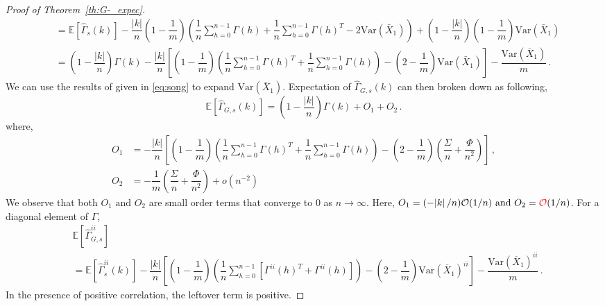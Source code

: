 \documentclass[11pt]{article}
\newcommand{\E}{\mathbb{E}}
\newcommand{\Var}{\text{Var}}
\theoremstyle{remark}
\begin{document}
\begin{proof}[Proof of Theorem~\ref{th:G-_expec}]
\begin{align*}
    &= \mathbb{E}\left[\hat{\Gamma}_{s}(k)\right] - \dfrac{|k|}{n}\left(1-\dfrac{1}{m}\right)\left(\dfrac{1}{n}\sum_{h=0}^{n-1}\Gamma(h) + \dfrac{1}{n}\sum_{h=0}^{n-1}\Gamma(h)^T - 2 \Var(\bar{X}_1)\right) + \left(1- \dfrac{|k|}{n}\right)\left(1-\dfrac{1}{m}\right)\Var(\bar{X}_1)\\
    &= \left(1- \dfrac{|k|}{n}\right)\Gamma(k) - \dfrac{|k|}{n}\left[\left(1-\dfrac{1}{m}\right)\left(\dfrac{1}{n}\sum_{h=0}^{n-1}\Gamma(h)^T + \dfrac{1}{n}\sum_{h=0}^{n-1}\Gamma(h)\right) - \left(2-\dfrac{1}{m}\right) \Var(\bar{X}_1)\right] - \dfrac{\Var(\overline{X}_1)}{m}\,.
\end{align*}
%
 We can use the results of \cite{song1995optimal} given in \eqref{eq:song} to expand $\Var(\bar{X}_1)$. Expectation of $\hat{\Gamma}_{G,s}(k)$ can then broken down as following,
 \begin{equation} \label{eq:G-_expec_breakdown}
     \mathbb{E}\left[\hat{\Gamma}_{G,s}(k)\right] = \left(1- \dfrac{|k|}{n}\right)\Gamma(k) + O_1 + O_2\,.
 \end{equation}
%
where,
\begin{align*}
    O_1 &= -\dfrac{|k|}{n}\left[\left(1-\dfrac{1}{m}\right)\left(\dfrac{1}{n}\sum_{h=0}^{n-1}\Gamma(h)^T + \dfrac{1}{n}\sum_{h=0}^{n-1}\Gamma(h)\right) - \left(2-\dfrac{1}{m}\right) \left(\dfrac{\Sigma}{n} + \dfrac{\Phi}{n^2}\right)\right] \, ,\\
    O_2 &= -\dfrac{1}{m}\left(\dfrac{\Sigma}{n} + \dfrac{\Phi}{n^2}\right) + o(n^{-2})
\end{align*}
%
We observe that both $O_1 \textrm{ and } O_2$ are small order terms that converge to 0 as $n \to \infty$. Here, $O_1 = (-\abs{k}/n)\mathcal{O}(1/n) \textrm{ and } O_2 = {\color{red}\mathcal{O}}(1/n)$. For a diagonal element of $\Gamma$,
%
\begin{align*}
& \E \left[ \hat{\Gamma}_{G,s}^{ii}\right]\\
& = \mathbb{E}\left[\hat{\Gamma}^{ii}_{s}(k)\right] - \dfrac{|k|}{n}\left[\left(1-\dfrac{1}{m}\right)\left(\dfrac{1}{n}\sum_{h=0}^{n-1} \left[\Gamma^{ii}(h)^T + \Gamma^{ii}(h) \right] \right) - \left(2-\dfrac{1}{m}\right) \Var(\overline{X}_1)^{ii}\right] - \dfrac{\Var(\overline{X}_1)^{ii}}{m}\,.
\end{align*}
In the presence of positive correlation, the leftover term is positive.
\end{proof}
\end{document}
